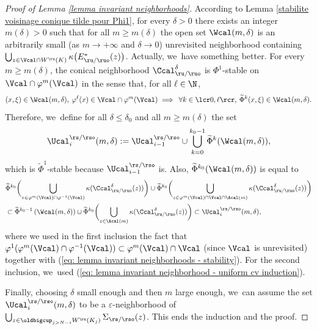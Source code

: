 \begin{proof}[Proof of Lemma \ref{lemma invariant neighborhoods}]
According to Lemma \ref{stabilite voisinage conique tilde pour Phi1}, for every $\delta > 0$ there exists an integer $m(\delta) > 0$ such that for all $m \geq m (\delta)$ the open set $\Wcal(m,\delta)$ is an arbitrarily small (as $m \to + \infty$ and $\delta \to 0$) unrevisited neighborhood containing $\bigcup_{z \in \Vcal\cap W^\ru (K)} \kappa \bigl(E_{\ru/\ruo}^* (z) \bigr)$. Actually, we~have something better. For every $m \geq m(\delta)$, the conical neighborhood $\Ccal_{\ru/\ruo}^{\delta}$ is $\Phi^1$-stable on $\Vcal \cap \varphi^m (\Vcal)$ in the sense that, for all $\ell \in \N$,
\begin{equation}\label{eq: lemma invariant neighborhoods - stability}
(x,\xi) \in \Wcal (m,\delta), \: \varphi^{\ell} (x) \in \Vcal \cap \varphi^{m} (\Vcal) \implies \: \forall k \in \lcr0, \ell \rcr, \: \widetilde{\Phi}^k (x,\xi) \in \Wcal (m,\delta).
\end{equation}
Therefore, we~define for all $\delta \leq \delta_0$ and all $m \geq m (\delta)$ the set
\[
\Ucal_i^{\rs/\rso} (m,\delta):= \Ucal_{i-1}^{\rs/\rso} \cup \bigcup_{k = 0}^{k_0 - 1} \widetilde{\Phi}^k (\Wcal (m,\delta)),
\]
which is $\widetilde{\Phi}^1$-stable because $\Ucal_{i-1}^{\rs/\rso}$ is. Also, $\widetilde{\Phi}^{k_0} (\Wcal (m,\delta))$ is equal to
\begin{align*}
& \widetilde{\Phi}^{k_0 } \biggl(\bigcup_{z \in \varphi^{m} (\Vcal) \cap \varphi^{-1} (\Vcal)} \kappa (\Ccal_{\ru/\ruo}^{\delta}(z)) \biggr) \cup \widetilde{\Phi}^{k_0} \biggl(\bigcup_{z \in \varphi^m (\Vcal) \cap \Vcal \cap \Acal (m)} \kappa (\Ccal_{\ru/\ruo}^{\delta}(z)) \biggr) \\
&\subset \widetilde{\Phi}^{k_0 -1} \left(\Wcal (m,\delta) \right) \cup \widetilde{\Phi}^{k_0} \biggl(\bigcup_{z \in \Acal (m)} \kappa (\Ccal_{\ru/\ruo}^{\delta}(z)) \biggr) \subset \Ucal_i^{\rs/\rso} (m,\delta),
\end{align*}
where we used in the first inclusion the fact that $\varphi^{1} (\varphi^m (\Vcal) \cap \varphi^{-1} (\Vcal)) \subset \varphi^m (\Vcal) \cap \Vcal$ (since $\Vcal$ is unrevisited) together with (\ref{eq: lemma invariant neighborhoods - stability}). For the second inclusion, we~used (\ref{eq: lemma invariant neighborhood - uniform cv induction}).

Finally, choosing $\delta$ small enough and then $m$ large enough, we~can assume the set $\Ucal_i^{\rs/\rso} (m,\delta)$ to be a $\varepsilon$-neighborhood of $\bigcup_{z \in \oldbigcup_{j > N-i} W^\ru (K_j)} \Sigma_{\rs/\rso} (z)$. This ends the induction and the proof.
\end{proof}


